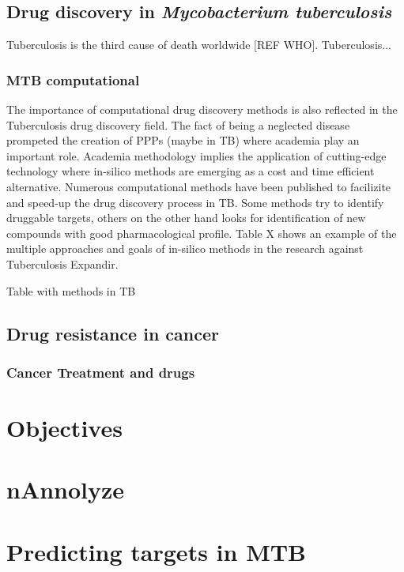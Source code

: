 \documentclass[12pt, a4paper,twoside]{tesi_upf}
\begin{document}
{\section{Drug discovery in \textit{Mycobacterium tuberculosis}}

\par Tuberculosis is the third cause of death worldwide [REF WHO]. Tuberculosis...

\subsection{MTB computational}

\par The importance of computational drug discovery methods is also reflected in the Tuberculosis drug discovery field. The fact of being a neglected disease prompeted the creation of PPPs (maybe in TB) where academia play an important role. Academia methodology implies the application of cutting-edge technology where in-silico methods are emerging as a cost and time efficient alternative. Numerous computational methods have been published to facilizite and speed-up the drug discovery process in TB. Some methods try to identify druggable targets, others on the other hand looks for identification of new compounds with good pharmacological profile. Table X shows an example of the multiple approaches and goals of in-silico methods in the research against Tuberculosis Expandir. 


Table with methods in TB


\section{Drug resistance in cancer}
\subsection{Cancer Treatment and drugs}





\chapter{Objectives}
\chapter{nAnnolyze}
\chapter{Predicting targets in MTB}
}
\end{document}
